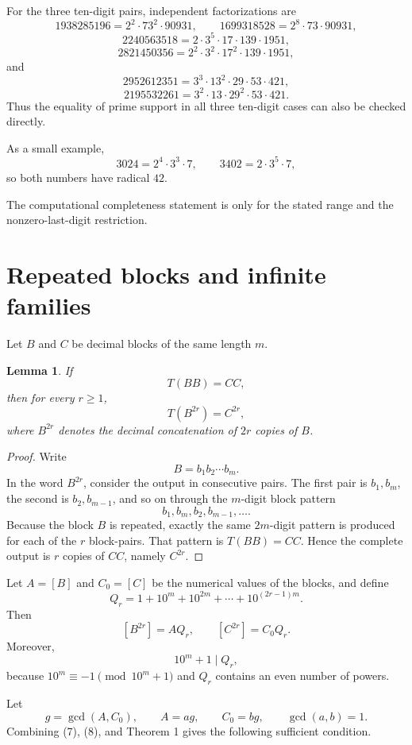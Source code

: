 \documentclass[11pt]{article}
\newtheorem{lemma}{Lemma}
\begin{document}
For the three ten-digit pairs, independent factorizations are
\[
1938285196=2^2\cdot73^2\cdot90931,
\qquad
1699318528=2^8\cdot73\cdot90931,
\]
\[
2240563518=2\cdot3^5\cdot17\cdot139\cdot1951,
\]
\[
2821450356=2^2\cdot3^2\cdot17^2\cdot139\cdot1951,
\]
and
\[
2952612351=3^3\cdot13^2\cdot29\cdot53\cdot421,
\]
\[
2195532261=3^2\cdot13\cdot29^2\cdot53\cdot421.
\]
Thus the equality of prime support in all three ten-digit cases can also be checked directly.

As a small example,
\[
3024=2^4\cdot3^3\cdot7,\qquad
3402=2\cdot3^5\cdot7,
\]
so both numbers have radical \(42\).

The computational completeness statement is only for the stated range and the nonzero-last-digit restriction.

\section{Repeated blocks and infinite families}

Let \(B\) and \(C\) be decimal blocks of the same length \(m\).

\begin{lemma}
If
\[
T(BB)=CC,
\tag{5}
\]
then for every \(r\ge1\),
\[
T(B^{2r})=C^{2r},
\tag{6}
\]
where \(B^{2r}\) denotes the decimal concatenation of \(2r\) copies of \(B\).
\end{lemma}

\begin{proof}
Write
\[
B=b_1b_2\cdots b_m.
\]
In the word \(B^{2r}\), consider the output in consecutive pairs. The first pair is \(b_1,b_m\), the second is \(b_2,b_{m-1}\), and so on through the \(m\)-digit block pattern
\[
b_1,b_m,b_2,b_{m-1},\ldots .
\]
Because the block \(B\) is repeated, exactly the same \(2m\)-digit pattern is produced for each of the \(r\) block-pairs. That pattern is \(T(BB)=CC\). Hence the complete output is \(r\) copies of \(CC\), namely \(C^{2r}\).
\end{proof}

Let \(A=[B]\) and \(C_0=[C]\) be the numerical values of the blocks, and define
\[
Q_r=1+10^m+10^{2m}+\cdots+10^{(2r-1)m}.
\]
Then
\[
[B^{2r}]=AQ_r,\qquad [C^{2r}]=C_0Q_r.
\tag{7}
\]
Moreover,
\[
10^m+1\mid Q_r,
\tag{8}
\]
because \(10^m\equiv-1\pmod{10^m+1}\) and \(Q_r\) contains an even number of powers.

Let
\[
g=\gcd(A,C_0),\qquad A=ag,\qquad C_0=bg,\qquad \gcd(a,b)=1.
\]
Combining (7), (8), and Theorem 1 gives the following sufficient condition.
\end{document}

